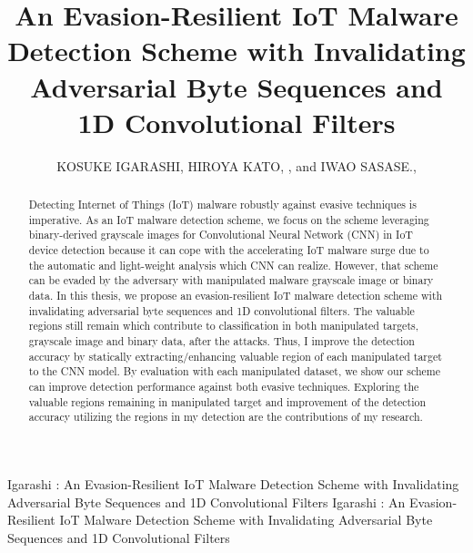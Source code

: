\documentclass{ieeeaccess}
\newcommand{\TI}{An Evasion-Resilient IoT Malware Detection Scheme with Invalidating Adversarial Byte Sequences and 1D Convolutional Filters}
\begin{document}

\title{An Evasion-Resilient IoT Malware Detection Scheme with Invalidating Adversarial Byte Sequences and 1D Convolutional Filters} 

\author{
  \uppercase{Kosuke Igarashi},
  \uppercase{Hiroya Kato}, ,
  and \uppercase{Iwao Sasase}., }
\address[1]{Department of Information and Computer Science, Faculty of Science and Technology, Keio University 3-14-1 Hiyoshi, Kohoku, Yokohama, Kanagawa 223-8522, Japan}

\markboth
{Igarashi \headeretal: \TI}
{Igarashi \headeretal: \TI}


\begingroup
\newlength{\xfigwd}
\setlength{\xfigwd}{\textwidth}

\begin{abstract}
Detecting Internet of Things (IoT) malware robustly against evasive techniques is imperative.
As an IoT malware detection scheme, we focus on the scheme leveraging binary-derived grayscale images for Convolutional Neural Network (CNN) in IoT device detection because it can cope with the accelerating IoT malware surge due to the automatic and light-weight analysis which CNN can realize.
However, that scheme can be evaded by the adversary with manipulated malware grayscale image or binary data.
In this thesis, we propose an evasion-resilient IoT malware detection scheme with invalidating adversarial byte sequences and 1D convolutional filters.
The valuable regions still remain which contribute to classification in both manipulated targets, grayscale image and binary data, after the attacks.
Thus, I improve the detection accuracy by statically extracting/enhancing valuable region of each manipulated target to the CNN model.
By evaluation with each manipulated dataset, we show our scheme can improve detection performance against both evasive techniques. 
Exploring the valuable regions remaining in manipulated target and improvement of the detection accuracy utilizing the regions in my detection are the contributions of my research. 
\end{abstract}
\end{document}

